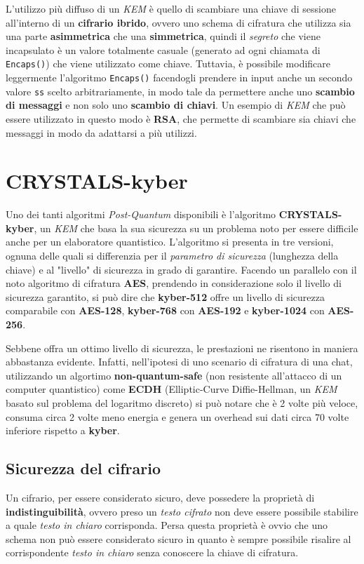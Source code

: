 L'utilizzo più diffuso di un \emph{KEM} è quello di scambiare una chiave di sessione all'interno di un \textbf{cifrario ibrido}, ovvero uno schema di cifratura che utilizza sia una parte \textbf{asimmetrica} che una \textbf{simmetrica}, quindi il \emph{segreto} che viene incapsulato è un valore totalmente casuale (generato ad ogni chiamata di \texttt{Encaps()}) che viene utilizzato come chiave. Tuttavia, è possibile modificare leggermente l'algoritmo \texttt{Encaps()} facendogli prendere in input anche un secondo valore \texttt{ss} scelto arbitrariamente, in modo tale da permettere anche uno \textbf{scambio di messaggi} e non solo uno \textbf{scambio di chiavi}. Un esempio di \emph{KEM} che può essere utilizzato in questo modo è \textbf{RSA}, che permette di scambiare sia chiavi che messaggi in modo da adattarsi a più utilizzi. \cite{wikipedia_kem}

\section{CRYSTALS-kyber}
Uno dei tanti algoritmi \emph{Post-Quantum} disponibili è l'algoritmo \textbf{CRYSTALS-kyber}, un \emph{KEM} che basa la sua sicurezza su un problema noto per essere difficile anche per un elaboratore quantistico. L'algoritmo si presenta in tre versioni, ognuna delle quali si differenzia per il \emph{parametro di sicurezza} (lunghezza della chiave) e al "livello" di sicurezza in grado di garantire. Facendo un parallelo con il noto algoritmo di cifratura \textbf{AES}, prendendo in considerazione solo il livello di sicurezza garantito, si può dire che \textbf{kyber-512} offre un livello di sicurezza comparabile con \textbf{AES-128}, \textbf{kyber-768} con \textbf{AES-192} e \textbf{kyber-1024} con \textbf{AES-256}. \cite{kyber}

Sebbene offra un ottimo livello di sicurezza, le prestazioni ne risentono in maniera abbastanza evidente. Infatti, nell'ipotesi di uno scenario di cifratura di una chat, utilizzando un algortimo \textbf{non-quantum-safe} (non resistente all'attacco di un computer quantistico) come \textbf{ECDH} (Elliptic-Curve Diffie-Hellman, un \emph{KEM} basato sul problema del logaritmo discreto) si può notare che è 2 volte più veloce, consuma circa 2 volte meno energia e genera un overhead sui dati circa 70 volte inferiore rispetto a \textbf{kyber}. \cite{wikipedia_kyber}

\subsection{Sicurezza del cifrario}
Un cifrario, per essere considerato sicuro, deve possedere la proprietà di \textbf{indistinguibilità}, ovvero preso un \emph{testo cifrato} non deve essere possibile stabilire a quale \emph{testo in chiaro} corrisponda. Persa questa proprietà è ovvio che uno schema non può essere considerato sicuro in quanto è sempre possibile risalire al corrispondente \emph{testo in chiaro} senza conoscere la chiave di cifratura.

